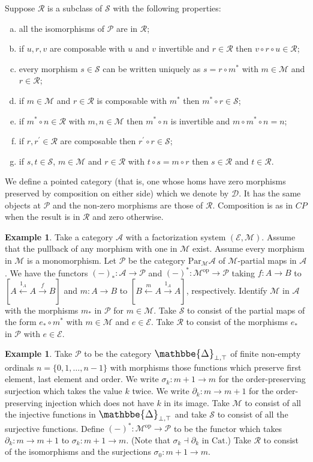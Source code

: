 \documentclass[a4paper,12pt,reqno]{amsart}
\def\makebigger#1#2#3{\hbox{#1$\mathsurround=0pt #2{#3}$}}
\def\bigger#1#2{{\relax\mathpalette{\makebigger#1}{#2}}}
\newcommand{\DelCat}{{\bigger\large{\mathbbe{\Delta}}}}
\theoremstyle{definition}
\newtheorem{example}[theorem]{Example}
\theoremstyle{fact}
\theoremstyle{genquest}
\theoremstyle{step}
\newcommand{\lra}{\longrightarrow}
\newcommand{\lla}{\longleftarrow}
\newcommand{\ra}{\rightarrow}
\def\CA{{\mathscr A}}
\def\CD{{\mathscr D}}
\def\CE{{\mathscr E}}
\def\CM{{\mathscr M}}
\def\CP{{\mathscr P}}
\def\CR{{\mathscr R}}
\def\CS{{\mathscr S}}
\begin{document}
Suppose $\CR$ is a subclass of $\CS$ with the following properties:
\begin{enumerate}[(a)]
\item all the isomorphisms of $\CP$ are in $\CR$;
\item if $u, r, v$ are composable with $u$ and $v$ invertible and $r\in \CR$ then $v\circ r \circ u\in \CR$;
\item every morphism $s\in \CS$ can be written uniquely as $s=r\circ m^*$ with $m\in \CM$ and $r\in \CR$;
\item if $m \in \CM$ and $r \in \CR$ is composable with $m^*$ then $m^*\circ r \in \CS$;
\item if $m^*\circ n \in \CR$ with $m,n \in \CM$ then $m^*\circ n$ is invertible and $m\circ m^*\circ n = n$;
\item if $r, r^{\prime} \in \CR$ are composable then $r^{\prime}\circ r \in \CS$;
\item if $s, t \in \CS$, $m\in \CM$ and $r\in \CR$ with $t\circ s = m\circ r$ then $s \in \CR$ and $t\in \CR$. 
\end{enumerate}

We define a pointed category (that is, one whose homs have zero morphisms preserved by composition
on either side) which we denote by $\CD$. It has the same objects at $\CP$ and the non-zero morphisms are those of $\CR$.
Composition is as in $CP$ when the result is in $\CR$ and zero otherwise.

\begin{example}\label{Ex1+}
Take a category $\CA$ with a factorization system $(\CE,\CM)$. 
Assume that the pullback of any morphism with one in $\CM$ exist. 
Assume every morphism in $\CM$ is a monomorphism. 
Let $\CP$ be the category $\mathrm{Par}_{\CM}\CA$ of $\CM$-partial maps in $\CA$.
We have the functors $(-)_*: \CA \lra \CP$ and $(-)^*: \CM^{\mathrm{op}} \lra \CP$
taking $f : A\lra B$ to $[A \stackrel{1_A}\lla A\stackrel{f} \lra B]$
and $m : A\lra B$ to $[B \stackrel{m}\lla A\stackrel{1_A} \lra A]$, respectively.   
Identify $\CM$ in $\CA$ with the morphisms $m_*$ in $\CP$ for $m\in \CM$.
Take $\CS$ to consist of the partial maps of the form $e_*\circ m^*$ with $m \in \CM$ and $e\in \CE$.
Take $\CR$ to consist of the morphisms $e_*$ in $\CP$ with $e\in \CE$.
\end{example}

\begin{example}\label{Ex2+}
Take $\CP$ to be the category $\DelCat_{\bot,\top}$ of finite
non-empty ordinals $n = \{0,1,\dots,n-1\}$ with morphisms those functions which preserve
first element, last element and order.
We write $\sigma_k : m+1 \ra m$ for the order-preserving surjection which takes the value $k$ twice.
We write $\partial_k : m \ra m+1$ for the order-preserving injection which does not have $k$ in its image.
Take $\CM$ to consist of all the injective functions in $\DelCat_{\bot,\top}$
and take $\CS$ to consist of all the surjective functions. 
Define $(-)^*: \CM^{\mathrm{op}} \lra \CP$ to be the functor which takes $\partial_k : m \ra m+1$
to $\sigma_k : m+1 \ra m$. (Note that $\sigma_k \dashv \partial_k$ in $\mathrm{Cat}$.) 
Take $\CR$ to consist of the isomorphisms and the surjections $\sigma_0 : m+1 \lra m$.
\end{example}
\end{document}
